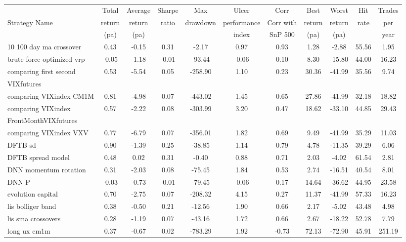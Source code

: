 \documentclass[12pt,a4paper, openany]{article}
\begin{document}
\begin{sidewaystable}
\centering
\begin{tabular}{l|cccccccccc}
  \hline
  & Total & Average & Sharpe & Max & Ulcer & Corr & Best & Worst & Hit & Trades \\
  Strategy Name & return & return & ratio & drawdown & performance & Corr with & return & return & rate & per \\
  & (pa) & (pa) &  &  & index & SnP 500 & (pa) & (pa) & & year \\
  \hline
  10 100 day ma crossover & 0.43 & -0.15 & 0.31 & -2.17 & 0.97 & 0.93 & 1.28 & -2.88 & 55.56 & 1.95 \\ 
  brute force optimized vrp & -0.05 & -1.18 & -0.01 & -93.44 & -0.06 & 0.10 & 8.30 & -15.80 & 44.00 & 16.23 \\ 
  comparing first second & 0.53 & -5.54 & 0.05 & -258.90 & 1.10 & 0.23 & 30.36 & -41.99 & 35.56 & 9.74 \\ 
  VIXfutures &  &  &  &  &  &  &  &  &  & \\ 
  comparing VIXindex CM1M & 0.81 & -4.98 & 0.07 & -443.02 & 1.45 & 0.65 & 27.86 & -41.99 & 32.18 & 18.82 \\ 
  comparing VIXindex & 0.57 & -2.22 & 0.08 & -303.99 & 3.20 & 0.47 & 18.62 & -33.10 & 44.85 & 29.43 \\ 
  FrontMonthVIXfutures &  &  &  &  &  &  &  &  &  & \\ 
  comparing VIXindex VXV & 0.77 & -6.79 & 0.07 & -356.01 & 1.82 & 0.69 & 9.49 & -41.99 & 35.29 & 11.03 \\ 
  DFTB sd & 0.90 & -1.39 & 0.25 & -38.85 & 1.14 & 0.79 & 4.78 & -11.35 & 39.29 & 6.06 \\ 
  DFTB spread model & 0.48 & 0.02 & 0.31 & -0.40 & 0.88 & 0.71 & 2.03 & -4.02 & 61.54 & 2.81 \\ 
  DNN momentum rotation & 0.31 & -2.03 & 0.08 & -75.45 & 1.84 & 0.53 & 2.74 & -16.51 & 40.54 & 8.01 \\ 
  DNN P & -0.03 & -0.73 & -0.01 & -79.45 & -0.06 & 0.17 & 14.64 & -36.62 & 44.95 & 23.58 \\ 
  evolution capital & 0.70 & -2.75 & 0.07 & -208.32 & 4.15 & 0.27 & 11.37 & -41.99 & 57.33 & 16.23 \\ 
  lis bolliger band & 0.38 & -0.50 & 0.21 & -12.56 & 1.90 & 0.66 & 2.17 & -5.02 & 43.48 & 4.98 \\ 
  lis sma crossovers & 0.28 & -1.19 & 0.07 & -43.16 & 1.72 & 0.66 & 2.67 & -18.22 & 52.78 & 7.79 \\ 
  long ux cm1m & 0.37 & -0.67 & 0.02 & -783.29 & 1.92 & -0.73 & 72.13 & -72.90 & 45.91 & 251.19 \\ 

\end{tabular}
\end{sidewaystable}
\end{document}
